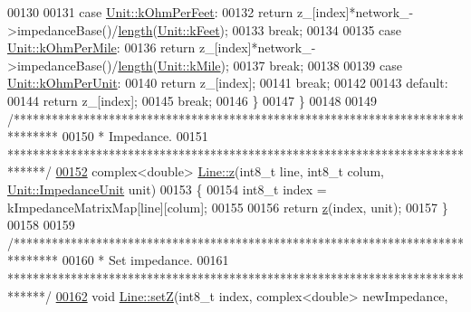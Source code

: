 \begin{DoxyCode}
00130 
00131   \textcolor{keywordflow}{case} \hyperlink{class_unit_a3747e779c805df24a71961290be3fbdfa433b57934ca3be960ec7a60f3ea6ea87}{Unit::kOhmPerFeet}:
00132     \textcolor{keywordflow}{return} z\_[index]*network\_->impedanceBase()/\hyperlink{group___models_gae2e4500d0fa60dcc2ecb08b2c96954f9}{length}(\hyperlink{class_unit_a8c8921f7b225ad6063b1cb573425b9a0a9ac9b167b0ebce477fb53d6ace04ddc8}{Unit::kFeet});
00133     \textcolor{keywordflow}{break};
00134 
00135   \textcolor{keywordflow}{case} \hyperlink{class_unit_a3747e779c805df24a71961290be3fbdfa1d5bb04c9ecda66b09891af21cd4f613}{Unit::kOhmPerMile}:
00136     \textcolor{keywordflow}{return} z\_[index]*network\_->impedanceBase()/\hyperlink{group___models_gae2e4500d0fa60dcc2ecb08b2c96954f9}{length}(\hyperlink{class_unit_a8c8921f7b225ad6063b1cb573425b9a0a2ebde742068bbee0510de32fbb4cd724}{Unit::kMile});
00137     \textcolor{keywordflow}{break};
00138 
00139   \textcolor{keywordflow}{case} \hyperlink{class_unit_a3747e779c805df24a71961290be3fbdfa9327dc8628a47375d70037499f9d0910}{Unit::kOhmPerUnit}:
00140     \textcolor{keywordflow}{return} z\_[index];
00141     \textcolor{keywordflow}{break};
00142 
00143   \textcolor{keywordflow}{default}:
00144     \textcolor{keywordflow}{return} z\_[index];
00145     \textcolor{keywordflow}{break};
00146   \}
00147 \}
00148 
00149 \textcolor{comment}{/*******************************************************************************}
00150 \textcolor{comment}{ * Impedance.}
00151 \textcolor{comment}{ ******************************************************************************/}
\hypertarget{line_8cpp_source_l00152}{}\hyperlink{group___models_ga508b2db19afc02064c1afe494a25ebcc}{00152} complex<double> \hyperlink{group___models_ga0b44ccb2f14635c42d7eab3fe8940692}{Line::z}(int8\_t line, int8\_t colum, \hyperlink{class_unit_a3747e779c805df24a71961290be3fbdf}{Unit::ImpedanceUnit} unit)
00153 \{
00154   int8\_t index = kImpedanceMatrixMap[line][colum];
00155 
00156   \textcolor{keywordflow}{return} \hyperlink{group___models_ga0b44ccb2f14635c42d7eab3fe8940692}{z}(index, unit);
00157 \}
00158 
00159 \textcolor{comment}{/*******************************************************************************}
00160 \textcolor{comment}{ * Set impedance.}
00161 \textcolor{comment}{ ******************************************************************************/}
\hypertarget{line_8cpp_source_l00162}{}\hyperlink{group___models_ga2b8fe47ae4ae2d4422d9431e17b4927d}{00162} \textcolor{keywordtype}{void} \hyperlink{group___models_ga2b8fe47ae4ae2d4422d9431e17b4927d}{Line::setZ}(int8\_t index, complex<double> newImpedance,

\end{DoxyCode}
